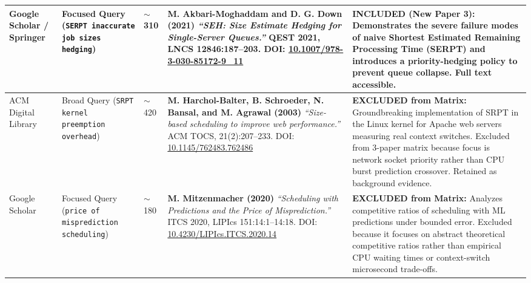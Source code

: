 \documentclass[11pt]{article}
\begin{document}
{\begin{longtable}{|>{\raggedright\arraybackslash}p{2.2cm}|>{\raggedright\arraybackslash}p{3.8cm}|>{\raggedright\arraybackslash}p{1.4cm}|>{\raggedright\arraybackslash}p{4.2cm}|>{\raggedright\arraybackslash}p{3.5cm}|}
    Google Scholar / Springer & 
    Focused Query (\texttt{SERPT inaccurate job sizes hedging}) & 
    $\sim$310 & 
    \textbf{M. Akbari-Moghaddam and D. G. Down (2021)} \newline
    \textit{``SEH: Size Estimate Hedging for Single-Server Queues.''} \newline
    QEST 2021, LNCS 12846:187--203. \newline
    DOI: \url{10.1007/978-3-030-85172-9_11} & 
    \textbf{INCLUDED (New Paper 3):} \newline
    Demonstrates the severe failure modes of naive Shortest Estimated Remaining Processing Time (SERPT) and introduces a priority-hedging policy to prevent queue collapse. Full text accessible. \\
    \hline

    ACM Digital Library & 
    Broad Query (\texttt{SRPT kernel preemption overhead}) & 
    $\sim$420 & 
    \textbf{M. Harchol-Balter, B. Schroeder, N. Bansal, and M. Agrawal (2003)} \newline
    \textit{``Size-based scheduling to improve web performance.''} \newline
    ACM TOCS, 21(2):207--233. \newline
    DOI: \url{10.1145/762483.762486} & 
    \textbf{EXCLUDED from Matrix:} \newline
    Groundbreaking implementation of SRPT in the Linux kernel for Apache web servers measuring real context switches. Excluded from 3-paper matrix because focus is network socket priority rather than CPU burst prediction crossover. Retained as background evidence. \\
    \hline

    Google Scholar & 
    Focused Query (\texttt{price of misprediction scheduling}) & 
    $\sim$180 & 
    \textbf{M. Mitzenmacher (2020)} \newline
    \textit{``Scheduling with Predictions and the Price of Misprediction.''} \newline
    ITCS 2020, LIPIcs 151:14:1--14:18. \newline
    DOI: \url{10.4230/LIPIcs.ITCS.2020.14} & 
    \textbf{EXCLUDED from Matrix:} \newline
    Analyzes competitive ratios of scheduling with ML predictions under bounded error. Excluded because it focuses on abstract theoretical competitive ratios rather than empirical CPU waiting times or context-switch microsecond trade-offs. \\
    \hline

\end{longtable}
}
\end{document}

